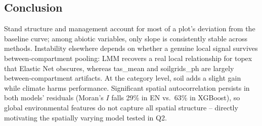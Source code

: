 \documentclass[logo,msc,ai]{infthesis}           %
\newcommand{\fig}[1]{\textcolor{purple}{[FIG: #1]}}
\begin{document}



\subsection*{Conclusion}
Stand structure and management account for most of a plot's deviation from the baseline curve; among abiotic variables, only slope is consistently stable across methods. Instability elsewhere depends on whether a genuine local signal survives between-compartment pooling: LMM recovers a real local relationship for topex that Elastic Net obscures, whereas tas\_mean and soilgrids\_ph are largely between-compartment artifacts. At the category level, soil adds a slight gain while climate harms performance. Significant spatial autocorrelation persists in both models' residuals (Moran's $I$ falls 29\% in EN vs.\ 63\% in XGBoost), so global environmental features do not capture all spatial structure -- directly motivating the spatially varying model tested in Q2.
\end{document}
